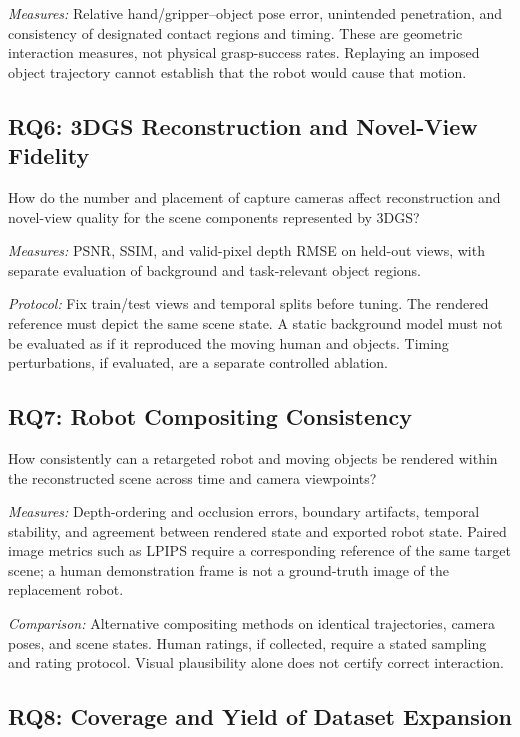 \textit{Measures:} Relative hand/gripper--object pose error, unintended
penetration, and consistency of designated contact regions and timing.
These are geometric interaction measures, not physical grasp-success rates.
Replaying an imposed object trajectory cannot establish that the robot would
cause that motion.

\subsection*{RQ6: 3DGS Reconstruction and Novel-View Fidelity}

How do the number and placement of capture cameras affect reconstruction and
novel-view quality for the scene components represented by 3DGS?

\textit{Measures:} PSNR, SSIM, and valid-pixel depth RMSE on held-out views,
with separate evaluation of background and task-relevant object regions.

\textit{Protocol:} Fix train/test views and temporal splits before tuning.
The rendered reference must depict the same scene state. A static background
model must not be evaluated as if it reproduced the moving human and objects.
Timing perturbations, if evaluated, are a separate controlled ablation.

\subsection*{RQ7: Robot Compositing Consistency}

How consistently can a retargeted robot and moving objects be rendered within
the reconstructed scene across time and camera viewpoints?

\textit{Measures:} Depth-ordering and occlusion errors, boundary artifacts,
temporal stability, and agreement between rendered state and exported robot
state. Paired image metrics such as LPIPS require a corresponding reference
of the same target scene; a human demonstration frame is not a ground-truth
image of the replacement robot.

\textit{Comparison:} Alternative compositing methods on identical trajectories,
camera poses, and scene states. Human ratings, if collected, require a stated
sampling and rating protocol. Visual plausibility alone does not certify
correct interaction.

\subsection*{RQ8: Coverage and Yield of Dataset Expansion}

